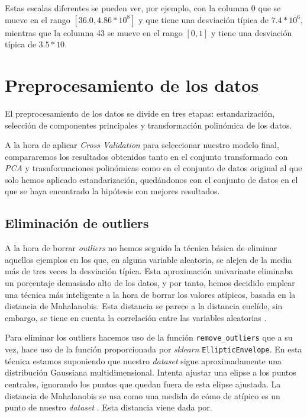\documentclass[11pt]{article}
\begin{document}
Estas escalas diferentes se pueden ver, por ejemplo, con la columna 0 que se mueve en el rango $[36.0, 4.86 * 10^8]$ y que tiene una desviación típica de $7.4 * 10^6$, mientras que la columna 43 se mueve en el rango $[0, 1]$ y tiene una desviación típica de $3.5 * 10$.

\pagebreak

\section{Preprocesamiento de los datos} \label{preprocesado}

El preprocesamiento de los datos se divide en tres etapas: estandarización, selección de componentes principales y transformación polinómica de los datos.

A la hora de aplicar \emph{Cross Validation} para seleccionar nuestro modelo final, compararemos los resultados obtenidos tanto en el conjunto transformado con \emph{PCA} y trasnformaciones polinómicas como en el conjunto de datos original al que solo hemos aplicado estandarización, quedándonos con el conjunto de datos en el que se haya encontrado la hipótesis con mejores resultados.

\subsection{Eliminación de outliers}

A la hora de borrar \emph{outliers} no hemos seguido la técnica básica de eliminar aquellos ejemplos en los que, en alguna variable aleatoria, se alejen de la media más de tres veces la desviación típica. Esta aproximación univariante eliminaba un porcentaje demasiado alto de los datos, y por tanto, hemos decidido emplear una técnica más inteligente a la hora de borrar los valores atípicos, basada en la distancia de Mahalanobis. Esta distancia se parece a la distancia euclíde, sin embargo, se tiene en cuenta la correlación entre las variables aleatorias \cite{wiki_mahalanobis:online}.

Para eliminar los outliers hacemos uso de la función \lstinline{remove_outliers} que a su vez, hace uso de la función proporcionada por \emph{sklearn} \lstinline{EllipticEnvelope}. En esta técnica estamos suponiendo que nuestro \emph{dataset} sigue aproximadamente una distribución Gaussiana multidimensional. Intenta ajustar una elipse a los puntos centrales, ignorando los puntos que quedan fuera de esta elipse ajustada. La distancia de Mahalanobis se usa como una medida de cómo de atípico es un punto de nuestro \emph{dataset} \cite{sklearn_outlier:online}. Esta distancia viene dada por.
\end{document}
